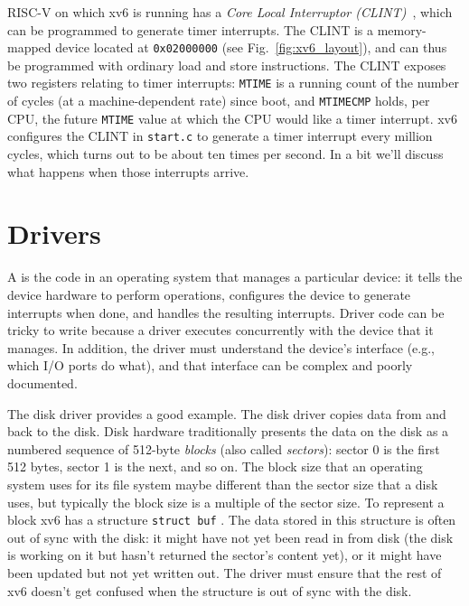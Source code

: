 RISC-V on which xv6 is running has a \textit{Core Local
  Interruptor (CLINT)}~\cite{u54}, which
can be programmed to generate timer interrupts.  The CLINT is a
memory-mapped device located at \lstinline{0x02000000} (see
Fig.~\ref{fig:xv6_layout}), and can thus be programmed with ordinary
load and store instructions. The CLINT exposes two registers relating
to timer interrupts: {\tt MTIME} is a running count of the number of
cycles (at a machine-dependent rate) since boot, and {\tt MTIMECMP}
holds, per CPU, the future {\tt MTIME} value at which the CPU
would like a timer interrupt.
xv6 configures the CLINT in {\tt start.c}
to generate a timer interrupt
every million cycles, which turns out to be about ten times
per second. In a bit we'll discuss what happens when those
interrupts arrive.

\section{Drivers}

A
is the code in an operating system that manages a particular device:
it tells the device hardware to perform operations,
configures the device to generate interrupts when done,
and handles the resulting interrupts.
Driver code can be tricky to write
because a driver executes concurrently with the device that it manages.  In
addition, the driver must understand the device's interface (e.g., which I/O
ports do what), and that interface can be complex and poorly documented.

The disk driver provides a good example.  The disk driver copies data
from and back to the disk.  Disk hardware traditionally presents the data on the
disk as a numbered sequence of 512-byte 
\textit{blocks} 
(also called 
\textit{sectors}): 
sector 0 is the first 512 bytes, sector 1 is the next, and so on. The block size
that an operating system uses for its file system maybe different than the
sector size that a disk uses, but typically the block size is a multiple of the
sector size. To
represent a block xv6 has a structure
\lstinline{struct buf}
.
The
data stored in this structure is often out of sync with the disk: it might have
not yet been read in from disk (the disk is working on it but hasn't returned
the sector's content yet), or it might have been updated but not yet written
out.  The driver must ensure that the rest of xv6 doesn't get confused when the
structure is out of sync with the disk.

